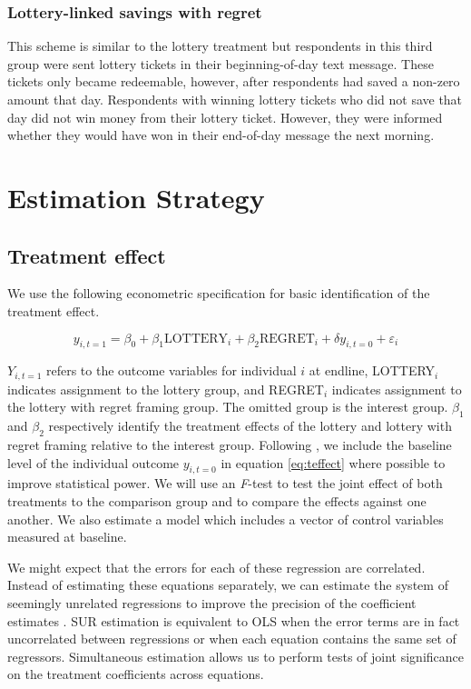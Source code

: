 \documentclass[10pt]{article}
\begin{document}
		\subsubsection{Lottery-linked savings with regret}

			This scheme is similar to the lottery treatment but respondents in this third group were sent lottery tickets in their beginning-of-day text message. These tickets only became redeemable, however, after respondents had saved a non-zero amount that day. Respondents with winning lottery tickets who did not save that day did not win money from their lottery ticket. However, they were informed whether they would have won in their end-of-day message the next morning. 

\section{Estimation Strategy} \label{sec:est}
	
	\subsection{Treatment effect}
		
		We use the following econometric specification for basic identification of the treatment effect.

		\begin{equation}
		y_{i,t=1} = \beta_{0} + \beta_{1}\text{LOTTERY}_{i} + \beta_{2}\text{REGRET}_{i} + \delta y_{i,t=0} + \varepsilon_{i}
		\label{eq:teffect} \end{equation}

		$Y_{i,t=1}$ refers to the outcome variables for individual $i$ at endline, LOTTERY$_i$ indicates assignment to the lottery group, and REGRET$_i$ indicates assignment to the lottery with regret framing group. The omitted group is the interest group. $\beta_{1}$ and $\beta_{2}$ respectively identify the treatment effects of the lottery and lottery with regret framing relative to the interest group. Following , we include the baseline level of the individual outcome $y_{i,t=0}$ in equation \ref{eq:teffect} where possible to improve statistical power. We will use an \emph{F}-test to test the joint effect of both treatments to the comparison group and to compare the effects against one another. We also estimate a model which includes a vector of control variables measured at baseline.

		We might expect that the errors for each of these regression are correlated. Instead of estimating these equations separately, we can estimate the system of seemingly unrelated regressions to improve the precision of the coefficient estimates . SUR estimation is equivalent to OLS when the error terms are in fact uncorrelated between regressions or when each equation contains the same set of regressors. Simultaneous estimation allows us to perform tests of joint significance on the treatment coefficients across equations. 
\end{document}
